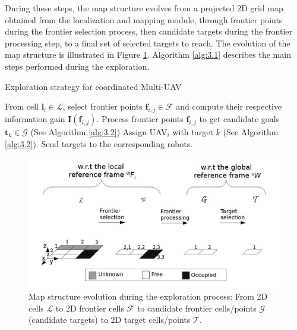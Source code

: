 \documentclass[11pt,openany]{book}
\begin{document}
During these steps, the map structure evolves from a projected 2D grid map obtained from the localization and mapping module, through frontier points during the frontier selection process, then candidate targets during the frontier processing step, to a final set of selected targets to reach. The evolution of the map structure is illustrated in Figure \ref{fig:3.2}. Algorithm \ref{alg:3.1} describes the main steps performed during the exploration.
\begin{algorithm}
    \caption{Exploration strategy for coordinated Multi-UAV}
    \label{alg:3.1}
    \begin{algorithmic}[1]
        \STATE From cell $\mathbf{l}_l \in \mathcal{L}$, select frontier points $\mathbf{f}_{i,j} \in \mathcal{F}$ and compute their respective information gain $\mathit{\mathbf{I}}(\mathbf{f}_{i,j})$.
        \STATE Process frontier points $\mathbf{f}_{i,j}$ to get candidate goals $\mathbf{t}_k \in \mathcal{G}$ (See Algorithm \ref{alg:3.2})
        \STATE Assign UAV$_i$ with target $k$ (See Algorithm \ref{alg:3.2}).
        \STATE Send targets to the corresponding robots.
    \end{algorithmic}
\end{algorithm}
\begin{figure}[H]
    \centering
    \includegraphics[scale=0.4]{assets/3_2.png}
    \caption{Map structure evolution during the exploration process: From 2D cells $\mathcal{L}$ to 2D frontier cells $\mathcal{F}$ to candidate frontier cells/points $\mathcal{G}$ (candidate targets) to 2D target cells/points $\mathcal{T}$.}
    \label{fig:3.2}
\end{figure}
\end{document}

